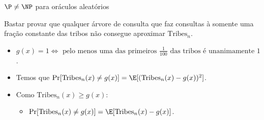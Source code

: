 \documentclass[landscape, 9pt]{beamer}
\newcommand{\Tribes}{\text{Tribes}}
\begin{document}
\begin{frame} {$\P \neq \NP$ para oráculos aleatórios}

Bastar provar que qualquer árvore de consulta que faz consultas à somente uma fração constante das tribos não consegue aproximar $\Tribes_{n}$.

\begin{itemize}

	\item $g(x) = 1 \iff \text{ pelo menos uma das primeiros  } \frac{1}{100} \text{ das tribos é unanimamente 1}$.
	
	\item Temos que $\Pr[\Tribes_{n}(x) \neq g(x)] = \E[(\Tribes_{n}(x) - g(x))^{2}]$.

	\item Como $\Tribes_{n}(x) \geq g(x)$:
	
	\begin{itemize}
	
		\item $\Pr[\Tribes_{n}(x) \neq g(x)] = \E[\Tribes_{n}(x) - g(x)]$.
	
	\end{itemize}

\end{itemize}

\end{frame}

\end{document}
